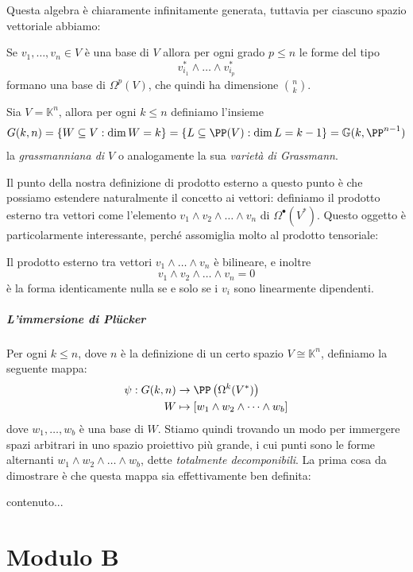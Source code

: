 \documentclass[11pt]{scrartcl}
\newcommand{\KK}{\mathbb{K}}
\begin{document}
	Questa algebra è chiaramente infinitamente generata, tuttavia per ciascuno spazio vettoriale abbiamo:
	\begin{theorem}
		Se $v_1,\dots,v_n\in V$ è una base di $V$ allora per ogni grado $p\le n$ le forme del tipo
		$$v_{i_1}^*\land \dots \land v_{i_p}^*$$
		formano una base di $\Omega^p(V)$, che quindi ha dimensione $\binom{n}{k}$.
	\end{theorem}
	\begin{definition}
		Sia $V=\KK^n$, allora per ogni $k\le n$ definiamo l'insieme
		$$G(k,n)=\left\{W\subseteq V:\dim W=k\right\}=\left\{L\subseteq \PP(V):\dim L = k-1\right\}=\mathbb{G}(k,\PP^{n-1})$$
		la \textit{grassmanniana di $V$} o analogamente la sua \textit{varietà di Grassmann}.
	\end{definition}
	Il punto della nostra definizione di prodotto esterno a questo punto è che possiamo estendere naturalmente il concetto ai vettori: definiamo il prodotto esterno tra vettori come l'elemento $v_1\land v_2\land\dots\land v_n$ di $\Omega^\bullet(V^*)$. Questo oggetto è particolarmente interessante, perché assomiglia molto al prodotto tensoriale:
	\begin{theorem}
		Il prodotto esterno tra vettori $v_1\land \dots\land v_n$ è bilineare, e inoltre 
		$$v_1\land v_2\land \dots \land v_n=0$$
		è la forma identicamente nulla se e solo se i $v_i$ sono linearmente dipendenti.
	\end{theorem}  
	
	\subsubsection{L'immersione di Pl\"ucker}
	
	Per ogni $k\le n$, dove $n$ è la definizione di un certo spazio $V\cong \KK^n$, definiamo la seguente mappa:
	\begin{align*}
		\psi:G(k,n) & \to \PP\left(\Omega^k(V^*)\right) \\
		W & \mapsto [w_1\land w_2\land \dots \land w_b]
	\end{align*}
	dove $w_1,\dots,w_b$ è una base di $W$. Stiamo quindi trovando un modo per immergere spazi arbitrari in uno spazio proiettivo più grande, i cui punti sono le forme alternanti $w_1\land w_2\land \dots \land w_b$, dette \textit{totalmente decomponibili}. La prima cosa da dimostrare è che questa mappa sia effettivamente ben definita:
	\begin{proposition}
		contenuto...
	\end{proposition}
	
	\newpage
	
	\part{Modulo B}
	
\end{document}
